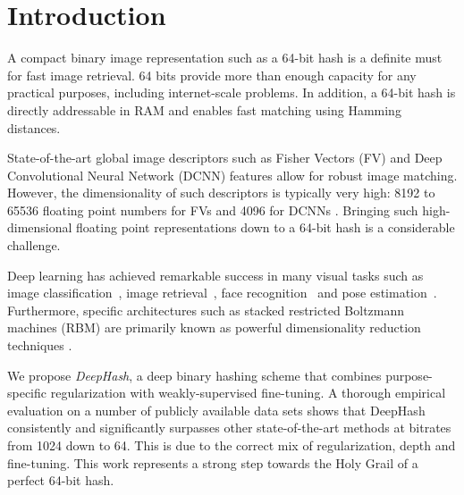 \documentclass[10pt,twocolumn,letterpaper]{article}
\begin{document}
\section{Introduction}

A compact binary image representation such as a 64-bit hash is a definite must for fast image retrieval.
64 bits provide more than enough capacity for any practical purposes, including internet-scale problems.
In addition, a 64-bit hash is directly addressable in RAM and enables fast matching using Hamming distances.

State-of-the-art global image descriptors such as Fisher Vectors (FV) \cite{Perronnin_CVPR_10} and Deep Convolutional Neural Network (DCNN) features \cite{AlexNet,Yandex} allow for robust image matching.
However, the dimensionality of such descriptors is typically very high: 8192 to 65536 floating point numbers for FVs\cite{Perronnin_CVPR_10} and 4096 for DCNNs \cite{AlexNet}.
Bringing such high-dimensional floating point representations down to a 64-bit hash is a considerable challenge.

Deep learning has achieved remarkable success in many visual tasks such as image classification~\cite{AlexNet,VeryDeepNeuralNets}, image retrieval~\cite{Yandex}, face recognition~\cite{deepface,deepid} and pose estimation~\cite{deeppose}. 
Furthermore, specific architectures such as stacked restricted Boltzmann machines (RBM) are primarily known as powerful dimensionality reduction techniques \cite{HintonRBM}.

We propose {\it DeepHash}, a deep binary hashing scheme that combines purpose-specific regularization with weakly-supervised fine-tuning.
A thorough empirical evaluation on a number of publicly available data sets shows that DeepHash consistently and significantly surpasses other state-of-the-art methods at bitrates from 1024 down to 64.
This is due to the correct mix of regularization, depth and fine-tuning.
This work represents a strong step towards the Holy Grail of a perfect 64-bit hash.
\end{document}
